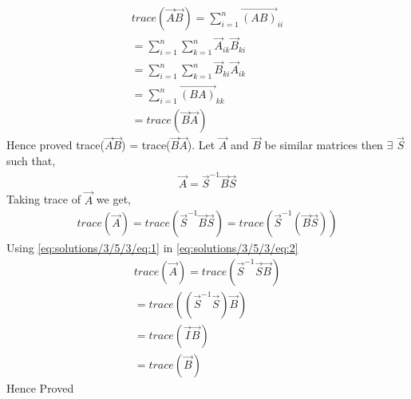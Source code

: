 
\begin{align}
trace(\vec{A}\vec{B})= \sum_{i=1}^{n}\vec{(AB)}_{ii}\\
=\sum_{i=1}^{n}\sum_{k=1}^{n}\vec{A}_{ik}\vec{B}_{ki}\\
=\sum_{i=1}^{n}\sum_{k=1}^{n}\vec{B}_{ki}\vec{A}_{ik}\\
=\sum_{i=1}^{n}\vec{(BA)}_{kk}\\
=trace(\vec{B}\vec{A}) \label{eq:solutions/3/5/3/eq:1}
\end{align}
Hence proved trace($\vec{A}\vec{B}$) = trace($\vec{B}\vec{A}$). Let $\vec{A}$ and $\vec{B}$ be similar matrices then $\exists$ $\vec{S}$ such that,
\begin{align}
\vec{A}= \vec{S}^{-1}\vec{B}\vec{S}
\end{align}
Taking trace of $\vec{A}$ we get,
\begin{align}
trace(\vec{A})= trace(\vec{S}^{-1}\vec{B}\vec{S}) =trace(\vec{S}^{-1}(\vec{B}\vec{S})) \label{eq:solutions/3/5/3/eq:2}
\end{align}
Using \eqref{eq:solutions/3/5/3/eq:1} in \eqref{eq:solutions/3/5/3/eq:2}
\begin{align}
trace(\vec{A})= trace(\vec{S}^{-1}\vec{S}\vec{B})\\
=trace((\vec{S}^{-1}\vec{S})\vec{B})\\
=trace(\vec{I}\vec{B})\\
=trace(\vec{B})
\end{align}
Hence Proved
